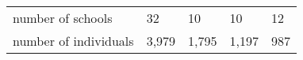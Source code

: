 \begin{table}[ht]
\begin{adjustbox}{max width=0.75\textwidth}
\begin{tabular}{lllll}
			\hline
			number of schools & 32 & 10 &10 & 12 \\
			number of individuals               & 3,979    & 1,795   & 1,197   & 987   \\ \hline\hline
		\end{tabular}%
	\end{adjustbox}
\end{table}